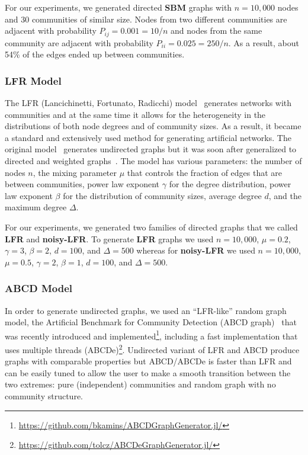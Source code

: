 \documentclass[11pt]{article}
\begin{document}
For our experiments, we generated directed \textbf{SBM} graphs with $n=10{,}000$ nodes and 30 communities of similar size. Nodes from two different communities are adjacent with probability $P_{ij} = 0.001=10/n$ and nodes from the same community are adjacent with probability $P_{ii} = 0.025=250/n$. As a result, about 54\% of the edges ended up between communities. 

\subsubsection{LFR Model}

The LFR (Lancichinetti, Fortunato, Radicchi) model~\cite{lancichinetti2008benchmark,lancichinetti2009benchmarks} generates networks with communities and at the same time it allows for the heterogeneity in the distributions of both node degrees and of community sizes. As a result, it became a standard and extensively used method for generating artificial networks. The original model~\cite{lancichinetti2008benchmark} generates undirected graphs but it was soon after generalized to directed and weighted graphs~\cite{lancichinetti2009benchmarks}. The model has various parameters: the number of nodes $n$, the mixing parameter $\mu$ that controls the fraction of edges that are between communities, power law exponent $\gamma$ for the degree distribution, power law exponent $\beta$ for the distribution of community sizes, average degree $d$, and the maximum degree $\Delta$. 

For our experiments, we generated two families of directed graphs that we called \textbf{LFR} and \textbf{noisy-LFR}. To generate \textbf{LFR} graphs we used $n=10{,}000$, $\mu=0.2$, $\gamma=3$, $\beta=2$, $d=100$, and $\Delta =  500$ whereas for \textbf{noisy-LFR} we used $n=10{,}000$, $\mu=0.5$, $\gamma=2$, $\beta=1$, $d=100$, and $\Delta=500$.

\subsubsection{ABCD Model}

In order to generate undirected graphs, we used an ``LFR-like'' random graph model, the Artificial Benchmark for Community Detection (ABCD graph)~\cite{kaminski2020artificial} that was recently introduced and implemented\footnote{\url{https://github.com/bkamins/ABCDGraphGenerator.jl/}}, including a fast implementation that uses multiple threads (ABCDe)\footnote{\url{https://github.com/tolcz/ABCDeGraphGenerator.jl/}}. Undirected variant of LFR and ABCD produce graphs with comparable properties but ABCD/ABCDe is faster than LFR and can be easily tuned to allow the user to make a smooth transition between the two extremes: pure (independent) communities and random graph with no community structure.
\end{document}
